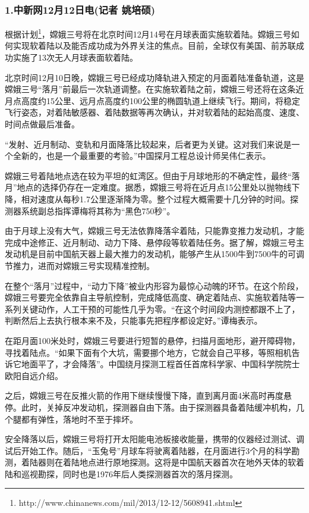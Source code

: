         \subsubsection{1.中新网12月12日电(记者 姚培硕)}
            \par
            根据计划\footnote{http://www.chinanews.com/mil/2013/12-12/5608941.shtml}，嫦娥三号将在北京时间12月14号在月球表面实施软着陆。嫦娥三号如何实现软着陆以及能否成功成为外界关注的焦点。目前，全球仅有美国、前苏联成功实施了13次无人月球表面软着陆。
            \par
            北京时间12月10日晚，嫦娥三号已经成功降轨进入预定的月面着陆准备轨道，这是嫦娥三号“落月”前最后一次轨道调整。在实施软着陆之前，嫦娥三号还将在这条近月点高度约15公里、远月点高度约100公里的椭圆轨道上继续飞行。期间，将稳定飞行姿态，对着陆敏感器、着陆数据等再次确认，并对软着陆的起始高度、速度、时间点做最后准备。
            \par
            “发射、近月制动、变轨和月面降落比较起来，后者更为关键。这对我们来说是一个全新的，也是一个最重要的考验。”中国探月工程总设计师吴伟仁表示。
            \par
            嫦娥三号着陆地点选在较为平坦的虹湾区。但由于月球地形的不确定性，最终“落月”地点的选择仍存在一定难度。据悉，嫦娥三号将在近月点15公里处以抛物线下降，相对速度从每秒1.7公里逐渐降为零。整个过程大概需要十几分钟的时间。探测器系统副总指挥谭梅将其称为“黑色750秒”。
            \par
            由于月球上没有大气，嫦娥三号无法依靠降落伞着陆，只能靠变推力发动机，才能完成中途修正、近月制动、动力下降、悬停段等软着陆任务。据了解，嫦娥三号主发动机是目前中国航天器上最大推力的发动机，能够产生从1500牛到7500牛的可调节推力，进而对嫦娥三号实现精准控制。
            \par
            在整个“落月”过程中，“动力下降”被业内形容为最惊心动魄的环节。在这个阶段，嫦娥三号要完全依靠自主导航控制，完成降低高度、确定着陆点、实施软着陆等一系列关键动作，人工干预的可能性几乎为零。“在这个时间段内测控都跟不上了，判断然后上去执行根本来不及，只能事先把程序都设定好。”谭梅表示。
            \par
            在距月面100米处时，嫦娥三号要进行短暂的悬停，扫描月面地形，避开障碍物，寻找着陆点。“如果下面有个大坑，需要挪个地方，它就会自己平移，等照相机告诉它地面平了，才会降落”。中国绕月探测工程首任首席科学家、中国科学院院士欧阳自远介绍。
            \par
            之后，嫦娥三号在反推火箭的作用下继续慢慢下降，直到离月面4米高时再度悬停。此时，关掉反冲发动机，探测器自由下落。由于探测器具备着陆缓冲机构，几个腿都有弹性，落地时不至于摔坏。
            \par
            安全降落以后，嫦娥三号将打开太阳能电池板接收能量，携带的仪器经过测试、调试后开始工作。随后，“玉兔号”月球车将驶离着陆器，在月面进行3个月的科学勘测，着陆器则在着陆地点进行原地探测。这将是中国航天器首次在地外天体的软着陆和巡视勘探，同时也是1976年后人类探测器首次的落月探测。
